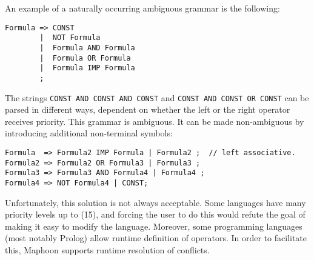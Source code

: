 \documentclass{article}
\begin{document}
An example of a naturally occurring ambiguous
grammar is the following: 
\begin{verbatim}
Formula => CONST    
        |  NOT Formula                
        |  Formula AND Formula    
        |  Formula OR Formula   
        |  Formula IMP Formula
        ;
\end{verbatim}
The strings \verb|CONST AND CONST AND CONST|
and \verb|CONST AND CONST OR CONST| can
be parsed in different ways, 
dependent on whether the left or the 
right operator receives priority.
This grammar is ambiguous. 
It can be made non-ambiguous
by introducing additional non-terminal symbols: 
\begin{verbatim}
Formula  => Formula2 IMP Formula | Formula2 ;  // left associative.
Formula2 => Formula2 OR Formula3 | Formula3 ;
Formula3 => Formula3 AND Formula4 | Formula4 ;
Formula4 => NOT Formula4 | CONST;
\end{verbatim}

\noindent
Unfortunately, this solution is not always acceptable.
Some languages have many priority levels up to (15),
and forcing the user to do this would refute
the goal of making it easy to modify the language. 
Moreover, some programming languages (most notably Prolog) allow
runtime definition of operators.
In order to facilitate this, Maphoon supports
runtime resolution of conflicts.
\end{document}
